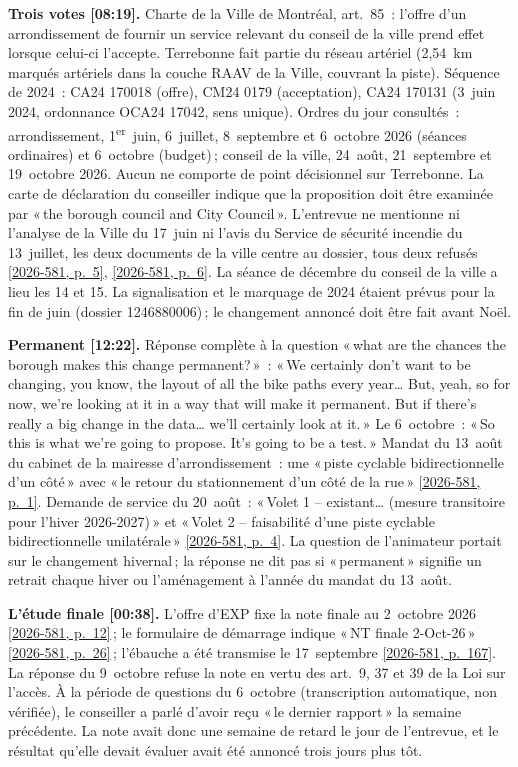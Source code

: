 \documentclass[11pt,letterpaper]{article}
\newcommand{\pagesurl}{https://openmobilitydata.github.io/Terrebonne-access-requests}
\newcommand{\cliptime}[1]{\textsf{\small[#1]}}
\newcommand{\pgl}[2]{\href{\pagesurl/2026-581/raw/01_emails_mandate_counts.pdf\#page=#1}{\textsf{\small[2026-581, p.~#2]}}}
\newcommand{\pg}[1]{\pgl{#1}{#1}}
\begin{document}
\textbf{Trois votes \cliptime{08:19}.} Charte de la Ville de Montréal,
art.~85~: l'offre d'un arrondissement de fournir un service relevant du
conseil de la ville prend effet lorsque celui-ci l'accepte. Terrebonne fait
partie du réseau artériel (2{,}54~km marqués artériels dans la couche RAAV
de la Ville, couvrant la piste). Séquence de 2024~: CA24 170018 (offre),
CM24 0179 (acceptation), CA24 170131 (3~juin 2024, ordonnance OCA24 17042,
sens unique). Ordres du jour consultés~: arrondissement, 1\textsuperscript{er}~juin,
6~juillet, 8~septembre et 6~octobre 2026 (séances ordinaires) et 6~octobre
(budget)\,; conseil de la ville, 24~août, 21~septembre et 19~octobre 2026.
Aucun ne comporte de point décisionnel sur Terrebonne. La carte de
déclaration du conseiller indique que la proposition doit être examinée par
«\,the borough council and City Council\,». L'entrevue ne mentionne ni
l'analyse de la Ville du 17~juin ni l'avis du Service de sécurité incendie
du 13~juillet, les deux documents de la ville centre au dossier, tous deux
refusés \pg{5}, \pg{6}. La séance de décembre du conseil de la ville a lieu
les 14 et 15. La signalisation et le marquage de 2024 étaient prévus pour la
fin de juin (dossier 1246880006)\,; le changement annoncé doit être fait
avant Noël.

\textbf{Permanent \cliptime{12:22}.} Réponse complète à la question «\,what
are the chances the borough makes this change permanent?\,»~: «\,We
certainly don't want to be changing, you know, the layout of all the bike
paths every year… But, yeah, so for now, we're looking at it in a way that
will make it permanent. But if there's really a big change in the data…
we'll certainly look at it.\,» Le 6~octobre~: «\,So this is what we're
going to propose. It's going to be a test.\,» Mandat du 13~août du cabinet
de la mairesse d'arrondissement~: une «\,piste cyclable bidirectionnelle
d'un côté\,» avec «\,le retour du stationnement d'un côté de la rue\,»
\pg{1}. Demande de service du 20~août~: «\,Volet 1 -- existant… (mesure
transitoire pour l'hiver 2026-2027)\,» et «\,Volet 2 -- faisabilité d'une
piste cyclable bidirectionnelle unilatérale\,» \pg{4}. La question de
l'animateur portait sur le changement hivernal\,; la réponse ne dit pas si
«\,permanent\,» signifie un retrait chaque hiver ou l'aménagement à l'année
du mandat du 13~août.

\textbf{L'étude finale \cliptime{00:38}.} L'offre d'EXP fixe la note
finale au 2~octobre 2026 \pg{12}\,; le formulaire de démarrage indique
«\,NT finale 2-Oct-26\,» \pg{26}\,; l'ébauche a été transmise le
17~septembre \pg{167}. La réponse du 9~octobre refuse la note en vertu des
art.~9, 37 et 39 de la Loi sur l'accès. À la période de questions du
6~octobre (transcription automatique, non vérifiée), le conseiller a parlé
d'avoir reçu «\,le dernier rapport\,» la semaine précédente. La note avait
donc une semaine de retard le jour de l'entrevue, et le résultat qu'elle
devait évaluer avait été annoncé trois jours plus tôt.
\end{document}
